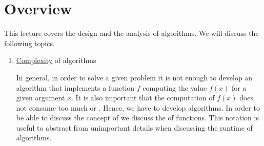 \section{Overview}
This lecture covers the design and the analysis of algorithms.  We will discuss the following topics.
\begin{enumerate}

\item \href{http://en.wikipedia.org/wiki/Computational_complexity_theory}{Complexity}  of algorithms

      In general, in order to solve a given problem it is not enough to develop an algorithm that
      implements a function $f$ computing the  value $f(x)$ for a given argument $x$.  It is also important  
      that the computation of $f(x)$ does not consume too much  or .  Hence, we have
      to develop  algorithms.  In order to be able to discuss the concept of  
      we discuss the  of functions.  This notation is useful to abstract from
      unimportant details when discussing the runtime of algorithms.  


\end{enumerate}
